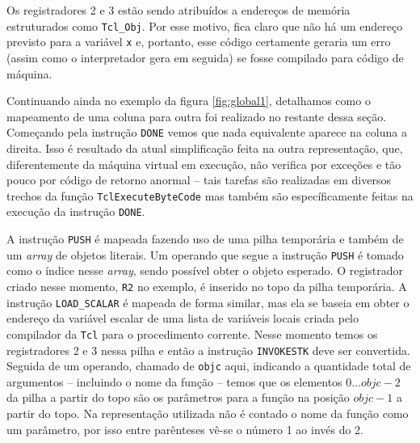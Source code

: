 Os registradores 2 e 3 estão sendo atribuídos a endereços de memória
estruturados como \verb!Tcl_Obj!. Por esse motivo, fica claro que não
há um endereço previsto para a variável \verb!x! e, portanto, esse
código certamente geraria um erro (assim como o interpretador gera em
seguida) se fosse compilado para código de máquina.%



Continuando ainda no exemplo da figura \ref{fig:global1}, detalhamos
como o mapeamento de uma coluna para outra foi realizado no restante
dessa seção. Começando
pela instrução \verb!DONE! vemos que
nada equivalente aparece na coluna a direita. Isso é resultado da
atual simplificação feita na outra representação, que, diferentemente
da máquina virtual em execução, não verifica por exceções e tão pouco
por código de retorno anormal -- tais tarefas são realizadas em
diversos trechos da função \verb!TclExecuteByteCode! mas também são
específicamente feitas na execução da instrução \verb!DONE!.

A instrução \verb!PUSH! é mapeada fazendo uso de uma pilha temporária e
também de um \textit{array} de objetos literais. Um operando que segue a
instrução \verb!PUSH! é tomado como o índice nesse \textit{array}, sendo
possível obter o objeto esperado. O registrador criado nesse momento,
\verb!R2! no exemplo, é
inserido no topo da pilha temporária. A instrução \verb!LOAD_SCALAR!
é mapeada de forma similar, mas ela se baseia em obter o
endereço da variável escalar de uma lista de variáveis locais
criada pelo compilador da \texttt{Tcl} para o procedimento
corrente. Nesse momento temos os registradores 2 e 3 nessa pilha e
então a instrução \verb!INVOKESTK! deve ser convertida. Seguida de um
operando, chamado de \verb!objc! aqui, indicando a quantidade total de
argumentos -- incluindo o nome da função -- temos que os elementos
$0 \dots objc - 2$ da pilha a partir do topo são os parâmetros para
a função na posição $objc - 1$ a partir do topo. Na representação
utilizada não é contado o nome da função como um parâmetro, por isso
entre parênteses vê-se o número 1 ao invés do 2.


